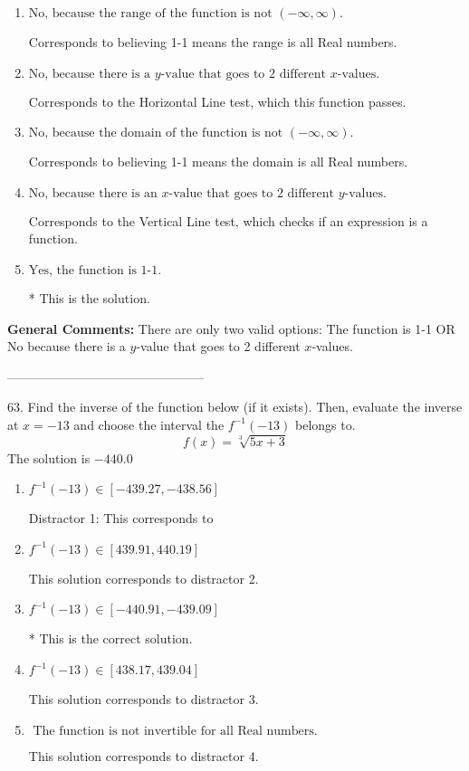 \documentclass{article}[14pt]
\begin{document}
\begin{enumerate}[label=\Alph*.] 
\item $ \text{No, because the range of the function is not $(-\infty, \infty)$.} $ 

 Corresponds to believing 1-1 means the range is all Real numbers. 
\item $ \text{No, because there is a $y$-value that goes to 2 different $x$-values.} $ 

 Corresponds to the Horizontal Line test, which this function passes. 
\item $ \text{No, because the domain of the function is not $(-\infty, \infty)$.} $ 

 Corresponds to believing 1-1 means the domain is all Real numbers. 
\item $ \text{No, because there is an $x$-value that goes to 2 different $y$-values.} $ 

 Corresponds to the Vertical Line test, which checks if an expression is a function. 
\item $ \text{Yes, the function is 1-1.} $ 

 * This is the solution. 
\end{enumerate} 
 
\textbf{General Comments:} There are only two valid options: The function is 1-1 OR No because there is a $y$-value that goes to 2 different $x$-values.

-----------------------------------------------

63. Find the inverse of the function below (if it exists). Then, evaluate the inverse at $x = -13$ and choose the interval the $f^{-1}(-13)$ belongs to.
$$ f(x) = \sqrt[3]{5 x + 3} $$ 
The solution is $ -440.0 $ 

\begin{enumerate}[label=\Alph*.] 
\item $ f^{-1}(-13) \in [-439.27, -438.56] $ 

  Distractor 1: This corresponds to  
\item $ f^{-1}(-13) \in [439.91, 440.19] $ 

  This solution corresponds to distractor 2. 
\item $ f^{-1}(-13) \in [-440.91, -439.09] $ 

 * This is the correct solution. 
\item $ f^{-1}(-13) \in [438.17, 439.04] $ 

  This solution corresponds to distractor 3. 
\item $ \text{ The function is not invertible for all Real numbers. } $ 

  This solution corresponds to distractor 4. 
\end{enumerate} 
 
\end{document}
